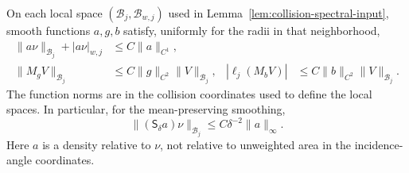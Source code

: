 \begin{lemma}
\label{lem:density-norm-details}
On each local space $(\mathcal B_j,\mathcal B_{w,j})$ used in
Lemma~\ref{lem:collision-spectral-input}, smooth functions $a,g,b$
satisfy, uniformly for the radii in that neighborhood,
\begin{align}
 \|a\nu\|_{\mathcal B_j}+|a\nu|_{w,j}
       &\le C\|a\|_{C^1},\label{eq:smooth-density-embedding}\\
 \|M_gV\|_{\mathcal B_j}&\le C\|g\|_{C^2}\|V\|_{\mathcal B_j},
 &|\ell_j(M_bV)|&\le C\|b\|_{C^2}\|V\|_{\mathcal B_j}.
 \label{eq:smooth-multiplier-pairing}
\end{align}
The function norms are in the collision coordinates used to define
the local spaces. In particular, for the mean-preserving smoothing,
\begin{equation}\label{eq:smoothed-density-vector}
 \| (\mathsf S_\delta a)\nu\|_{\mathcal B_j}
       \le C\delta^{-2}\|a\|_\infty .
\end{equation}
Here $a$ is a density relative to $\nu$, not relative to unweighted
area in the incidence-angle coordinates.
\end{lemma}
